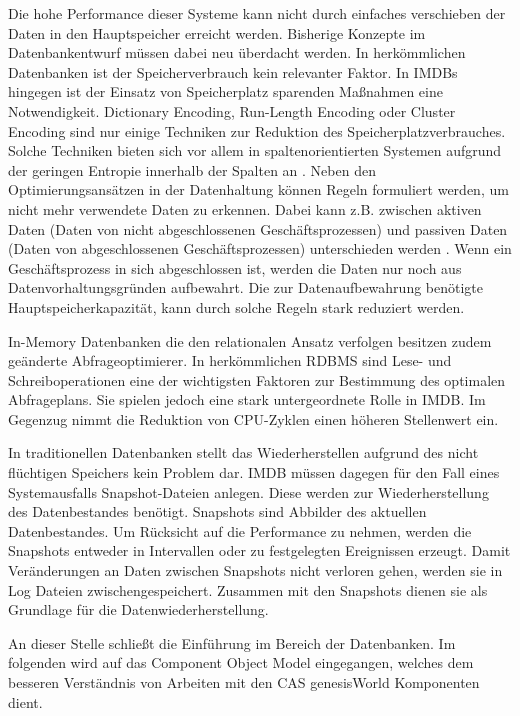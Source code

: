Die hohe Performance dieser Systeme kann nicht durch einfaches verschieben der Daten in den Hauptspeicher erreicht werden. Bisherige Konzepte im Datenbankentwurf müssen dabei neu überdacht werden. In herkömmlichen Datenbanken ist der Speicherverbrauch kein relevanter Faktor. In IMDBs hingegen ist der Einsatz von Speicherplatz sparenden Maßnahmen eine Notwendigkeit. Dictionary Encoding, Run-Length Encoding oder Cluster Encoding sind nur einige Techniken zur Reduktion des Speicherplatzverbrauches. Solche Techniken bieten sich vor allem in spaltenorientierten Systemen aufgrund der geringen Entropie innerhalb der Spalten an \cite{Abadi:2006:ICE:1142473.1142548}. Neben den Optimierungsansätzen in der Datenhaltung können Regeln formuliert werden, um nicht mehr verwendete Daten zu erkennen. Dabei kann z.B. zwischen aktiven Daten (Daten von nicht abgeschlossenen Geschäftsprozessen) und passiven Daten (Daten von abgeschlossenen Geschäftsprozessen) unterschieden werden \cite{10.1109/ICDE.2013.6544811}. Wenn ein Geschäftsprozess in sich abgeschlossen ist, werden die Daten nur noch aus Datenvorhaltungsgründen aufbewahrt. Die zur Datenaufbewahrung benötigte Hauptspeicherkapazität, kann durch solche Regeln stark reduziert werden.
 
In-Memory Datenbanken die den relationalen Ansatz verfolgen besitzen zudem geänderte Abfrageoptimierer. In herkömmlichen RDBMS sind Lese- und Schreiboperationen eine der wichtigsten Faktoren zur Bestimmung des optimalen Abfrageplans. Sie spielen jedoch eine stark untergeordnete Rolle in IMDB. Im Gegenzug nimmt die Reduktion von CPU-Zyklen einen höheren Stellenwert ein.

In traditionellen Datenbanken stellt das Wiederherstellen aufgrund des nicht flüchtigen Speichers kein Problem dar. IMDB müssen dagegen für den Fall eines Systemausfalls Snapshot-Dateien anlegen. Diese werden zur Wiederherstellung des Datenbestandes benötigt. Snapshots sind Abbilder des aktuellen Datenbestandes. Um Rücksicht auf die Performance zu nehmen, werden die Snapshots entweder in Intervallen oder zu festgelegten Ereignissen erzeugt. Damit Veränderungen an Daten zwischen Snapshots nicht verloren gehen, werden sie in Log Dateien zwischengespeichert. Zusammen mit den Snapshots dienen sie als Grundlage für die Datenwiederherstellung. 

An dieser Stelle schließt die Einführung im Bereich der Datenbanken. Im folgenden wird auf das Component Object Model eingegangen, welches dem besseren Verständnis von Arbeiten mit den CAS genesisWorld Komponenten dient.

